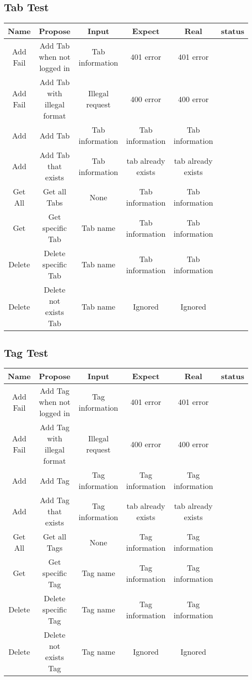   \subsection{Tab Test}
    \begin{tabular}{c|c|c|c|c|c}
      \hline
      Name & Propose & Input & Expect & Real & status \\ \hline
      Add Fail & Add Tab when not logged in & Tab information & 401 error & 401 error & \\ \hline
      Add Fail & Add Tab with illegal format & Illegal request & 400 error & 400 error & \\ \hline
      Add & Add Tab & Tab information & Tab information & Tab information & \\ \hline
      Add & Add Tab that exists & Tab information & tab already exists & tab already exists & \\ \hline
      Get All & Get all Tabs & None & Tab information & Tab information & \\ \hline
      Get & Get specific Tab & Tab name & Tab information & Tab information & \\ \hline
      Delete & Delete specific Tab & Tab name & Tab information & Tab information & \\ \hline
      Delete & Delete not exists Tab & Tab name & Ignored & Ignored & \\ \hline
    \end{tabular}
  \subsection{Tag Test}
    \begin{tabular}{c|c|c|c|c|c}
      \hline
      Name & Propose & Input & Expect & Real & status \\ \hline
      Add Fail & Add Tag when not logged in & Tag information & 401 error & 401 error & \\ \hline
      Add Fail & Add Tag with illegal format & Illegal request & 400 error & 400 error & \\ \hline
      Add & Add Tag & Tag information & Tag information & Tag information & \\ \hline
      Add & Add Tag that exists & Tag information & tab already exists & tab already exists & \\ \hline
      Get All & Get all Tags & None & Tag information & Tag information & \\ \hline
      Get & Get specific Tag & Tag name & Tag information & Tag information & \\ \hline
      Delete & Delete specific Tag & Tag name & Tag information & Tag information & \\ \hline
      Delete & Delete not exists Tag & Tag name & Ignored & Ignored & \\ \hline
    \end{tabular}
